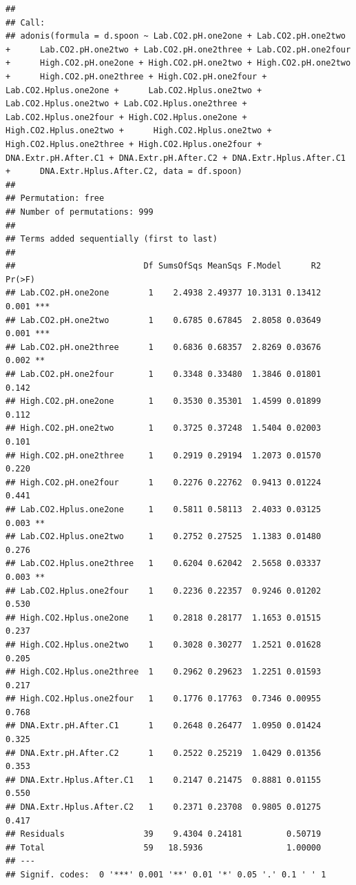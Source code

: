 \documentclass[]{article}
\begin{document}
\begin{verbatim}
## 
## Call:
## adonis(formula = d.spoon ~ Lab.CO2.pH.one2one + Lab.CO2.pH.one2two +      Lab.CO2.pH.one2two + Lab.CO2.pH.one2three + Lab.CO2.pH.one2four +      High.CO2.pH.one2one + High.CO2.pH.one2two + High.CO2.pH.one2two +      High.CO2.pH.one2three + High.CO2.pH.one2four + Lab.CO2.Hplus.one2one +      Lab.CO2.Hplus.one2two + Lab.CO2.Hplus.one2two + Lab.CO2.Hplus.one2three +      Lab.CO2.Hplus.one2four + High.CO2.Hplus.one2one + High.CO2.Hplus.one2two +      High.CO2.Hplus.one2two + High.CO2.Hplus.one2three + High.CO2.Hplus.one2four +      DNA.Extr.pH.After.C1 + DNA.Extr.pH.After.C2 + DNA.Extr.Hplus.After.C1 +      DNA.Extr.Hplus.After.C2, data = df.spoon) 
## 
## Permutation: free
## Number of permutations: 999
## 
## Terms added sequentially (first to last)
## 
##                          Df SumsOfSqs MeanSqs F.Model      R2 Pr(>F)    
## Lab.CO2.pH.one2one        1    2.4938 2.49377 10.3131 0.13412  0.001 ***
## Lab.CO2.pH.one2two        1    0.6785 0.67845  2.8058 0.03649  0.001 ***
## Lab.CO2.pH.one2three      1    0.6836 0.68357  2.8269 0.03676  0.002 ** 
## Lab.CO2.pH.one2four       1    0.3348 0.33480  1.3846 0.01801  0.142    
## High.CO2.pH.one2one       1    0.3530 0.35301  1.4599 0.01899  0.112    
## High.CO2.pH.one2two       1    0.3725 0.37248  1.5404 0.02003  0.101    
## High.CO2.pH.one2three     1    0.2919 0.29194  1.2073 0.01570  0.220    
## High.CO2.pH.one2four      1    0.2276 0.22762  0.9413 0.01224  0.441    
## Lab.CO2.Hplus.one2one     1    0.5811 0.58113  2.4033 0.03125  0.003 ** 
## Lab.CO2.Hplus.one2two     1    0.2752 0.27525  1.1383 0.01480  0.276    
## Lab.CO2.Hplus.one2three   1    0.6204 0.62042  2.5658 0.03337  0.003 ** 
## Lab.CO2.Hplus.one2four    1    0.2236 0.22357  0.9246 0.01202  0.530    
## High.CO2.Hplus.one2one    1    0.2818 0.28177  1.1653 0.01515  0.237    
## High.CO2.Hplus.one2two    1    0.3028 0.30277  1.2521 0.01628  0.205    
## High.CO2.Hplus.one2three  1    0.2962 0.29623  1.2251 0.01593  0.217    
## High.CO2.Hplus.one2four   1    0.1776 0.17763  0.7346 0.00955  0.768    
## DNA.Extr.pH.After.C1      1    0.2648 0.26477  1.0950 0.01424  0.325    
## DNA.Extr.pH.After.C2      1    0.2522 0.25219  1.0429 0.01356  0.353    
## DNA.Extr.Hplus.After.C1   1    0.2147 0.21475  0.8881 0.01155  0.550    
## DNA.Extr.Hplus.After.C2   1    0.2371 0.23708  0.9805 0.01275  0.417    
## Residuals                39    9.4304 0.24181         0.50719           
## Total                    59   18.5936                 1.00000           
## ---
## Signif. codes:  0 '***' 0.001 '**' 0.01 '*' 0.05 '.' 0.1 ' ' 1
\end{verbatim}
\end{document}
